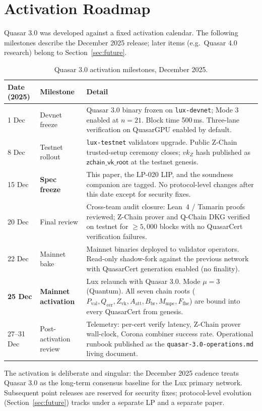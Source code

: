 \section{Activation Roadmap}

\label{sec:activation}

Quasar 3.0 was developed against a fixed activation calendar. The
following milestones describe the December 2025 release; later items
(e.g.\ Quasar 4.0 research) belong to Section~\ref{sec:future}.

\begin{table}[ht]
\centering
\small
\begin{tabular}{@{}lp{3cm}p{8cm}@{}}
\toprule
\textbf{Date (2025)} & \textbf{Milestone} & \textbf{Detail} \\
\midrule
1 Dec & Devnet freeze &
  Quasar 3.0 binary frozen on \texttt{lux-devnet}; Mode 3 enabled at
  $n=21$. Block time 500\,ms. Three-lane verification on QuasarGPU
  enabled by default. \\[3pt]
8 Dec & Testnet rollout &
  \texttt{lux-testnet} validators upgrade. Public Z-Chain
  trusted-setup ceremony closes; $\mathit{vk}_Z$ hash published as
  $\mathsf{zchain\_vk\_root}$ at the testnet genesis. \\[3pt]
15 Dec & \textbf{Spec freeze} &
  This paper, the LP-020 LIP, and the soundness companion
  \cite{qcert-proof} are tagged. No protocol-level changes after this
  date except for security fixes. \\[3pt]
20 Dec & Final review &
  Cross-team audit closure: Lean~4 / Tamarin proofs reviewed; Z-Chain
  prover and Q-Chain DKG verified on testnet for $\geq 5{,}000$ blocks
  with no QuasarCert verification failures. \\[3pt]
22 Dec & Mainnet bake &
  Mainnet binaries deployed to validator operators. Read-only
  shadow-fork against the previous network with QuasarCert generation
  enabled (no finality). \\[3pt]
\textbf{25 Dec} & \textbf{Mainnet activation} &
  Lux relaunch with Quasar 3.0. Mode $\mu = 3$ (Quantum). All seven
  chain roots ($P_\text{val}, Q_\text{cer}, Z_\text{vk},
  A_\text{att}, B_\text{br}, M_\text{mpc}, F_\text{fhe}$) are bound
  into every QuasarCert from genesis. \\[3pt]
27--31 Dec & Post-activation review &
  Telemetry: per-cert verify latency, Z-Chain prover wall-clock,
  Corona combiner success rate. Operational runbook published as
  the \texttt{quasar-3.0-operations.md} living document. \\
\bottomrule
\end{tabular}
\caption{Quasar 3.0 activation milestones, December 2025.}
\label{tab:roadmap}
\end{table}

The activation is deliberate and singular: the December 2025 cadence
treats Quasar 3.0 as the long-term consensus baseline for the Lux
primary network. Subsequent point releases are reserved for security
fixes; protocol-level evolution (Section~\ref{sec:future}) tracks under
a separate LP and a separate paper.


